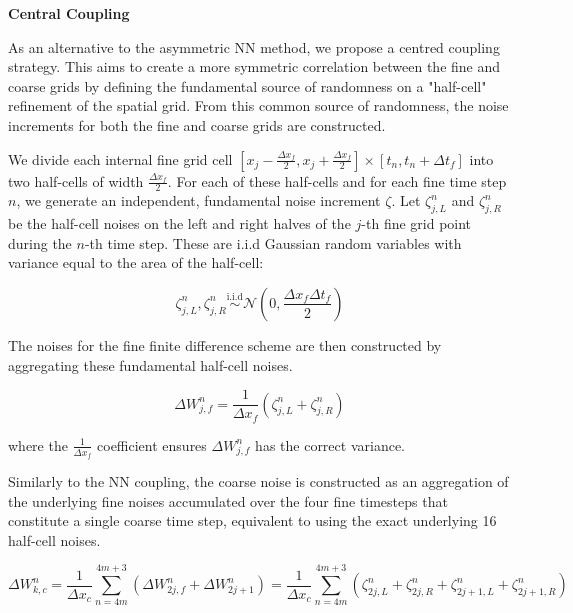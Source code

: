 \textbf{Central Coupling}

As an alternative to the asymmetric NN method, we
propose a centred coupling strategy. This aims 
to create a more symmetric correlation between the fine 
and coarse grids by defining the fundamental source 
of randomness on a "half-cell" refinement of the 
spatial grid. From this common source of randomness, 
the noise increments for both the fine and coarse 
grids are constructed. 

We divide each internal fine grid cell 
$[x_{j}-\frac{\Delta x_f}{2}, 
x_{j}+\frac{\Delta x_f}{2}]
\times [t_n, t_n + \Delta t_f]$ into
two half-cells of width $\frac{\Delta x_f}{2}$.
For each of these half-cells and for each fine time
step $n$, we generate an independent, fundamental 
noise increment $\zeta$. Let $\zeta_{j,L}^n$ and 
$\zeta_{j,R}^n$ be the half-cell noises on the left 
and right halves of the $j$-th fine grid point
during the $n$-th time step. These are 
i.i.d Gaussian random variables with variance 
equal to the area of the half-cell:

\begin{equation*}
    \zeta_{j,L}^n, \zeta_{j, R}^n 
    \overset{\mathrm{i.i.d}}{\sim} 
    \mathcal{N}(0, \frac{\Delta x_f \Delta t_f}{2})
\end{equation*}

The noises for the fine finite difference 
scheme are then constructed by aggregating 
these fundamental half-cell noises.

\begin{equation*}
    \Delta W_{j,f}^n = \frac{1}{\Delta x_f} 
    (\zeta_{j,L}^n + \zeta_{j,R}^n)
\end{equation*}

where the $\frac{1}{\Delta x_f}$ coefficient 
ensures $\Delta W_{j,f}^n$ has the correct variance. 

Similarly to the NN coupling, the coarse noise 
is constructed as an aggregation of 
the underlying fine noises accumulated over the
four fine timesteps that constitute a single
coarse time step, equivalent to using the 
exact underlying 16 half-cell noises.

\begin{equation*}
    \Delta W_{k, c}^n = \frac{1}{\Delta x_c}
    \sum_{n=4m}^{4m+3} \left(\Delta W_{2j,f}^n + 
    \Delta W_{2j+1}^n\right) = \frac{1}{\Delta x_c}
    \sum_{n=4m}^{4m+3} \left(\zeta_{2j,L}^n + 
    \zeta_{2j, R}^n + \zeta_{2j+1,L}^n + 
    \zeta_{2j+1,R}^n\right)
\end{equation*}

